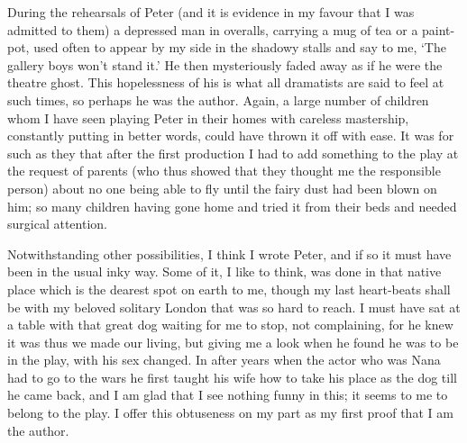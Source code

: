 During the rehearsals of Peter
(and it is evidence in my favour that I was admitted to them)
a depressed man in overalls, carrying a mug of tea or a paint-pot,
used often to appear by my side in the shadowy stalls and say to me,
‘The gallery boys won’t stand it.’
He then mysteriously faded away as if he were the theatre ghost.
This hopelessness of his is what all dramatists are said to feel at such times,
so perhaps he was the author.
Again, a large number of children whom I have seen playing Peter in their homes
with careless mastership, constantly putting in better words,
could have thrown it off with ease.
It was for such as they that after the first production
I had to add something to the play at the request of parents
(who thus showed that they thought me the responsible person)
about no one being able to fly until the fairy dust had been blown on him;
so many children having gone home and tried it from their beds and needed surgical attention.

Notwithstanding other possibilities, I think I wrote Peter,
and if so it must have been in the usual inky way.
Some of it, I like to think, was done in that native place which is the dearest spot on earth to me,
though my last heart-beats shall be with my beloved solitary London that was so hard to reach.
I must have sat at a table with that great dog waiting for me to stop,
not complaining, for he knew it was thus we made our living,
but giving me a look when he found he was to be in the play, with his sex changed.
In after years when the actor who was Nana had to go to the wars
he first taught his wife how to take his place as the dog till he came back,
and I am glad that I see nothing funny in this;
it seems to me to belong to the play.
I offer this obtuseness on my part as my first proof that I am the author.

